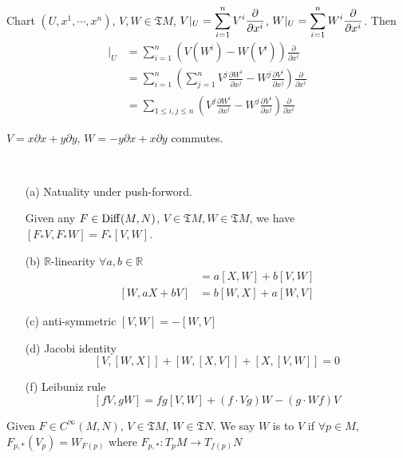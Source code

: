 \begin{proposition}
    Chart  $ (U,x^1,\cdots,x^n) $,  $ V,W\in \mathfrak{T}M $,  $ V|_U=\displaystyle\sum_{i=1}^n V^i\frac{\partial }{\partial  x^i} $,  $ W|_U=\displaystyle\sum_{i=1}^nW^i\frac{\partial}{\partial x^i} $. Then 
    \begin{align*}
        [V,W]|_U&=\sum_{i=1}^n(V(W^i)-W(V^i))\frac{\partial}{\partial x^i}\\
        &=\sum_{i=1}^n(\sum_{j=1}^nV^j\frac{\partial W^i}{\partial x^j}-W^j\frac{\partial V^i}{\partial x^j})\frac{\partial }{\partial x^i}\\
        &=\sum_{1 \leq i,j \leq n}(V^j\frac{\partial W^i}{\partial x^j}-W^j\frac{\partial V^i}{\partial x^j})\frac{\partial}{\partial x^i}
    \end{align*}
\end{proposition}
\begin{example}
     $ V=x\partial x+y\partial y $,  $ W=-y\partial x+x\partial y $ commutes.  
\end{example}
\begin{proposition}\label{properties of Lie bracket}
    \,
    \begin{enumerate}
        \item[(a)] Natuality under push-forword.
        
        Given any  $ F\in \mathrm{Diff}(M,N) $,  $ V\in \mathfrak{T}M, W\in \mathfrak{T}M  $, we have  $ [F_*V,F_*W]=F_*[V,W] $.
        \item[(b)]  $ \mathbb{R} $-linearity  $ \forall a,b\in \mathbb{R} $
        \begin{align*}
            [aX+bV,W]&=a[X,W]+b[V,W]\\
            [W,aX+bV]&=b[W,X]+a[W,V]
        \end{align*}  
        
        \item[(c)] anti-symmetric  $ [V,W]=-[W,V] $
        \item[(d)] Jacobi identity 
        \[[V,[W,X]]+[W,[X,V]]+[X,[V,W]]=0\]     
        \item[(f)] Leibuniz rule 
        \[[fV,gW]=fg[V,W]+(f\cdot Vg)W-(g\cdot Wf)V\]
    \end{enumerate}
\end{proposition}
\begin{definition}
    Given  $ F\in C^\infty(M,N) $,  $ V\in \mathfrak{T}M $,  $ W\in \mathfrak{T}N $. We say  $ W $ is   to  $ V $ if  $ \forall p\in M $,  $ F_{p,*}(V_p)=W_{F(p)} $ where $  F_{p,*}:T_pM\rightarrow T_{f(p)}N $      
\end{definition}
